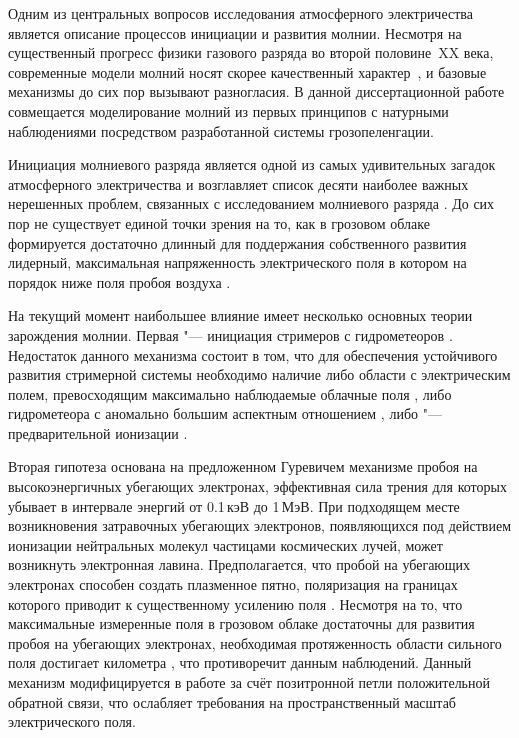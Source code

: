 Одним из центральных вопросов исследования атмосферного электричества является описание процессов инициации и развития молнии. Несмотря на существенный прогресс физики газового разряда во второй половине~XX века, современные модели молний носят скорее качественный характер~\autocite{Rakov-PhysicsOfLightning}, и базовые механизмы до сих пор вызывают разногласия. В данной диссертационной работе совмещается моделирование молний из первых принципов с натурными наблюдениями посредством разработанной системы грозопеленгации.

Инициация молниевого разряда является одной из самых удивительных загадок атмосферного электричества и возглавляет список десяти наиболее важных нерешенных проблем, связанных с исследованием молниевого разряда \autocite{Dwyer2014}. До сих пор не существует единой точки зрения на то, как в грозовом облаке формируется достаточно длинный для поддержания собственного развития лидерный, максимальная напряженность электрического поля в котором на порядок ниже поля пробоя воздуха \autocite{Marshall1995}.

На текущий момент наибольшее влияние имеет несколько основных теории зарождения молнии. Первая "--- инициация стримеров с гидрометеоров \autocite{Loeb1966, Phelps1974, Griffiths1976}. Недостаток данного механизма состоит в том, что для обеспечения устойчивого развития стримерной системы необходимо наличие либо области с электрическим полем, превосходящим максимально наблюдаемые облачные поля \autocite{Griffiths1976}, либо гидрометеора с аномально большим аспектным отношением \autocite{Dubinova2015}, либо "--- предварительной ионизации \autocite{Sadighi2015, Cai2017}.

Вторая гипотеза основана на предложенном Гуревичем \autocite{Gurevich1992} механизме пробоя на высокоэнергичных убегающих электронах, эффективная сила трения для которых убывает в интервале энергий от 0.1\,кэВ до 1\,МэВ. При подходящем месте возникновения затравочных убегающих электронов, появляющихся под действием ионизации нейтральных молекул частицами космических лучей, может возникнуть электронная лавина. Предполагается, что пробой на убегающих электронах способен создать плазменное пятно, поляризация на границах которого приводит к существенному усилению поля \autocite{Gurevich1999}. Несмотря на то, что максимальные измеренные поля в грозовом облаке достаточны для развития пробоя на убегающих электронах, необходимая протяженность области сильного поля достигает километра \autocite{Gurevich2001}, что противоречит данным наблюдений. Данный механизм модифицируется в работе \autocite{Dwyer2005} за счёт позитронной петли положительной обратной связи, что ослабляет требования на пространственный масштаб электрического поля.

